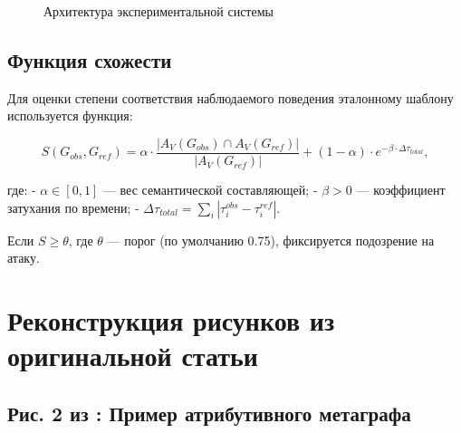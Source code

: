 \documentclass[12pt,a4paper]{article}
\begin{document}
\begin{figure}[ht]
\centering
{}
\caption{Архитектура экспериментальной системы}
\label{fig:arch}
\end{figure}

\subsection{Функция схожести}

Для оценки степени соответствия наблюдаемого поведения эталонному шаблону используется функция:

\begin{equation}
S(G_{obs}, G_{ref}) = \alpha \cdot \frac{|A_V(G_{obs}) \cap A_V(G_{ref})|}{|A_V(G_{ref})|} + (1 - \alpha) \cdot e^{-\beta \cdot \Delta\tau_{total}},
\end{equation}

где:
- $\alpha \in [0,1]$ — вес семантической составляющей;
- $\beta > 0$ — коэффициент затухания по времени;
- $\Delta\tau_{total} = \sum_{i} |\tau_i^{obs} - \tau_i^{ref}|$.

Если $S \geq \theta$, где $\theta$ — порог (по умолчанию 0.75), фиксируется подозрение на атаку.

\section{Реконструкция рисунков из оригинальной статьи}

\subsection{Рис. 2 из \cite{latypov2020}: Пример атрибутивного метаграфа}
\end{document}
